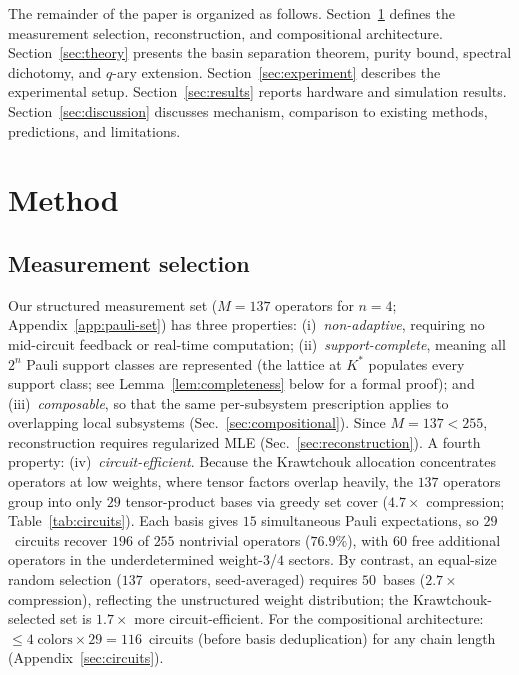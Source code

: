 \documentclass[twocolumn,prx,aps,superscriptaddress,longbibliography,floatfix]{revtex4-2}
\begin{document}
The remainder of the paper is organized as follows.
Section~\ref{sec:method} defines the measurement selection,
reconstruction, and compositional architecture.
Section~\ref{sec:theory} presents the basin separation theorem,
purity bound, spectral dichotomy, and $q$-ary extension.
Section~\ref{sec:experiment} describes the experimental setup.
Section~\ref{sec:results} reports hardware and simulation results.
Section~\ref{sec:discussion} discusses mechanism, comparison to
existing methods, predictions, and limitations.

\section{Method}
\label{sec:method}

\subsection{Measurement selection}
\label{sec:selection}

Our structured measurement set
($M = 137$ operators for $n = 4$; Appendix~\ref{app:pauli-set}) has three
properties: (i)~\emph{non-adaptive}, requiring no mid-circuit feedback or
real-time computation; (ii)~\emph{support-complete}, meaning all $2^n$ Pauli
support classes are represented
(the lattice at $K^*$ populates every support class;
see Lemma~\ref{lem:completeness} below for a formal proof); and
(iii)~\emph{composable}, so that the same per-subsystem prescription applies
to overlapping local subsystems (Sec.~\ref{sec:compositional}).
Since $M = 137 < 255$, reconstruction requires regularized MLE
(Sec.~\ref{sec:reconstruction}).
A fourth property: (iv)~\emph{circuit-efficient}.  Because
the Krawtchouk allocation concentrates operators at low weights,
where tensor factors overlap heavily, the $137$ operators group
into only $29$ tensor-product bases via greedy set cover
($4.7\times$ compression; Table~\ref{tab:circuits}).  Each basis gives $15$ simultaneous
Pauli expectations, so $29$~circuits recover $196$ of $255$
nontrivial operators ($76.9$\%), with $60$ free additional operators
in the underdetermined weight-$3$/$4$ sectors.
By contrast, an equal-size random selection ($137$~operators,
seed-averaged) requires $50$~bases ($2.7\times$ compression),
reflecting the unstructured weight distribution; the Krawtchouk-selected
set is $1.7\times$ more circuit-efficient.
For the compositional
architecture: $\le 4\;\text{colors} \times 29 = 116$~circuits
(before basis deduplication) for any chain length
(Appendix~\ref{sec:circuits}).
\end{document}
